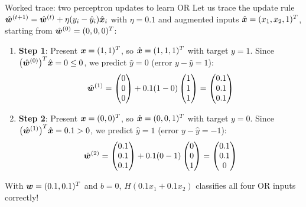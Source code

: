 \documentclass[aspectratio=169]{beamer}\usepackage[]{graphicx}\usepackage[]{xcolor}
\begin{document}
\begin{frame}{Worked trace: two perceptron updates to learn OR}
Let us trace the update rule $\hat{\bm{w}}^{(t+1)} = \hat{\bm{w}}^{(t)} + \eta(y_i - \hat{y}_i)\hat{\bm{x}}_i$ with $\eta = 0.1$ and augmented inputs $\hat{\bm{x}} = (x_1, x_2, 1)^T$, starting from $\hat{\bm{w}}^{(0)} = (0, 0, 0)^T$:
\vfill
\begin{enumerate}
\item \textbf{Step 1}: Present $\bm{x} = (1, 1)^T$, so $\hat{\bm{x}} = (1, 1, 1)^T$ with target $y = 1$. Since $\big(\hat{\bm{w}}^{(0)}\big)^T \hat{\bm{x}} = 0 \le 0$, we predict $\hat{y} = 0$ (error $y - \hat{y} = 1$):
\[
\hat{\bm{w}}^{(1)} = \begin{pmatrix} 0 \\ 0 \\ 0 \end{pmatrix} + 0.1 (1 - 0) \begin{pmatrix} 1 \\ 1 \\ 1 \end{pmatrix} = \begin{pmatrix} 0.1 \\ 0.1 \\ 0.1 \end{pmatrix}
\]
\vfill
\item \textbf{Step 2}: Present $\bm{x} = (0, 0)^T$, so $\hat{\bm{x}} = (0, 0, 1)^T$ with target $y = 0$. Since $\big(\hat{\bm{w}}^{(1)}\big)^T \hat{\bm{x}} = 0.1 > 0$, we predict $\hat{y} = 1$ (error $y - \hat{y} = -1$):
\[
\hat{\bm{w}}^{(2)} = \begin{pmatrix} 0.1 \\ 0.1 \\ 0.1 \end{pmatrix} + 0.1 (0 - 1) \begin{pmatrix} 0 \\ 0 \\ 1 \end{pmatrix} = \begin{pmatrix} 0.1 \\ 0.1 \\ 0 \end{pmatrix}
\]
\end{enumerate}
\vfill
With $\bm{w} = (0.1, 0.1)^T$ and $b = 0$, $H(0.1 x_1 + 0.1 x_2)$ classifies all four OR inputs correctly!
\end{frame}
\end{document}
